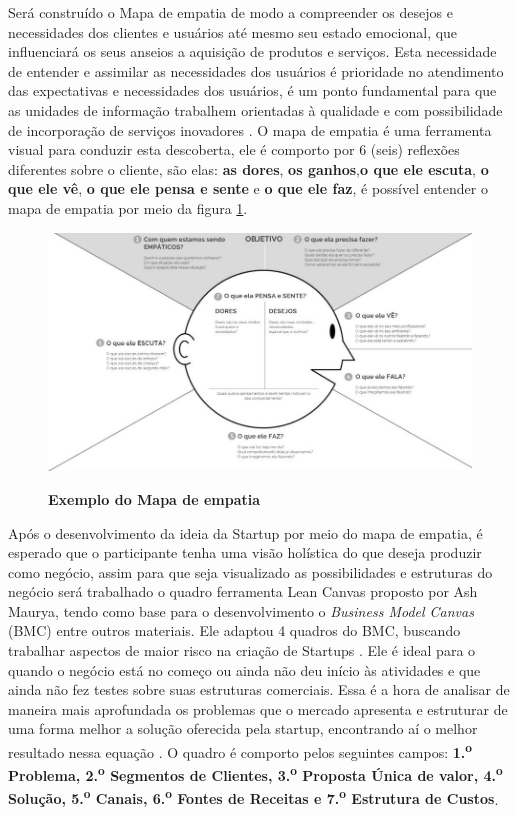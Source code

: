 Será construído o Mapa de empatia de modo a compreender os desejos e necessidades dos clientes e usuários até mesmo seu estado emocional, que influenciará os seus anseios a aquisição de produtos e serviços. Esta necessidade de entender e assimilar as necessidades dos usuários é prioridade no atendimento das expectativas e necessidades dos usuários, é um ponto fundamental para que as unidades de informação trabalhem orientadas à qualidade e com possibilidade de incorporação de serviços inovadores \cite{valdrich_mapa_2018}. O mapa de empatia é uma ferramenta visual para conduzir esta descoberta, ele é comporto por 6 (seis) reflexões diferentes sobre o cliente, são elas: \textbf{as dores}, \textbf{os ganhos},\textbf{o que ele escuta}, \textbf{o que ele vê}, \textbf{o que ele pensa e sente} e  \textbf{o que ele faz}, é possível entender o mapa de empatia por meio da figura \ref{figura_6}. 


\begin{figure}[h!]
\centering
\caption{\textbf{Exemplo do Mapa de empatia}}
\includegraphics[scale=0.4]{Imagens/mapa_empatia.jpg}
\label{figura_6}
\end{figure}


Após o desenvolvimento da ideia da Startup por meio do mapa de empatia, é esperado que o participante tenha uma visão holística do que deseja produzir como negócio, assim para que seja visualizado as possibilidades e estruturas do negócio será trabalhado o quadro ferramenta Lean Canvas proposto por Ash Maurya, tendo como base para o desenvolvimento o \textit{Business Model Canvas} (BMC) entre outros materiais. Ele adaptou 4 quadros do BMC, buscando trabalhar aspectos de maior risco na criação de Startups \cite{maurya_running_2012}. Ele é ideal para o quando o negócio está no começo ou ainda não deu início às atividades e que ainda não fez testes sobre suas estruturas comerciais. Essa é a hora de analisar de maneira mais aprofundada os problemas que o mercado apresenta e estruturar de uma forma melhor a solução oferecida pela startup, encontrando aí o melhor resultado nessa equação \cite{sebrae_aprenda_2019}. O quadro é comporto pelos seguintes campos: \textbf{1.\textsuperscript{o} Problema, 2.\textsuperscript{o} Segmentos de Clientes, 3.\textsuperscript{o} Proposta Única de valor, 4.\textsuperscript{o} Solução, 5.\textsuperscript{o} Canais, 6.\textsuperscript{o} Fontes de Receitas e 7.\textsuperscript{o} Estrutura de Custos}. 

